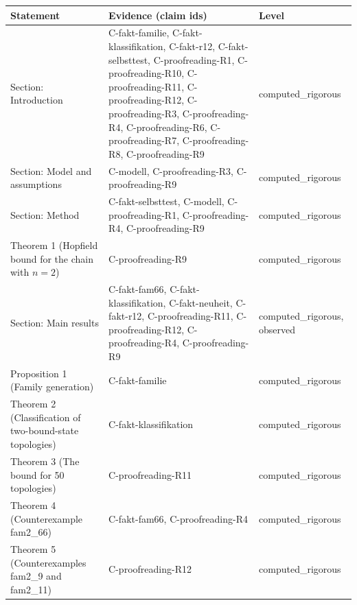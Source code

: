 \documentclass[11pt]{article}
\theoremstyle{definition}\newtheorem{definition}[theorem]{Definition}\newtheorem{example}[theorem]{Example}
\begin{document}
{\def\LTcaptype{none} %
\begin{longtable}[]{@{}
  >{\raggedright\arraybackslash}p{}
  >{\raggedright\arraybackslash}p{}
  >{\raggedright\arraybackslash}p{}@{}}
\toprule\noalign{}
\begin{minipage}[b]{\linewidth}\raggedright
Statement
\end{minipage} & \begin{minipage}[b]{\linewidth}\raggedright
Evidence (claim ids)
\end{minipage} & \begin{minipage}[b]{\linewidth}\raggedright
Level
\end{minipage} \\
\midrule\noalign{}
\endhead
\bottomrule\noalign{}
\endlastfoot
Section: Introduction & C-fakt-familie, C-fakt-klassifikation, C-fakt-r12, C-fakt-selbsttest, C-proofreading-R1, C-proofreading-R10, C-proofreading-R11, C-proofreading-R12, C-proofreading-R3, C-proofreading-R4, C-proofreading-R6, C-proofreading-R7, C-proofreading-R8, C-proofreading-R9 & computed\_rigorous \\
Section: Model and assumptions & C-modell, C-proofreading-R3, C-proofreading-R9 & computed\_rigorous \\
Section: Method & C-fakt-selbsttest, C-modell, C-proofreading-R1, C-proofreading-R4, C-proofreading-R9 & computed\_rigorous \\
Theorem 1 (Hopfield bound for the chain with \(n=2\)) & C-proofreading-R9 & computed\_rigorous \\
Section: Main results & C-fakt-fam66, C-fakt-klassifikation, C-fakt-neuheit, C-fakt-r12, C-proofreading-R11, C-proofreading-R12, C-proofreading-R4, C-proofreading-R9 & computed\_rigorous, observed \\
Proposition 1 (Family generation) & C-fakt-familie & computed\_rigorous \\
Theorem 2 (Classification of two-bound-state topologies) & C-fakt-klassifikation & computed\_rigorous \\
Theorem 3 (The bound for 50 topologies) & C-proofreading-R11 & computed\_rigorous \\
Theorem 4 (Counterexample fam2\_66) & C-fakt-fam66, C-proofreading-R4 & computed\_rigorous \\
Theorem 5 (Counterexamples fam2\_9 and fam2\_11) & C-proofreading-R12 & computed\_rigorous \\

\end{longtable}}
\end{document}
